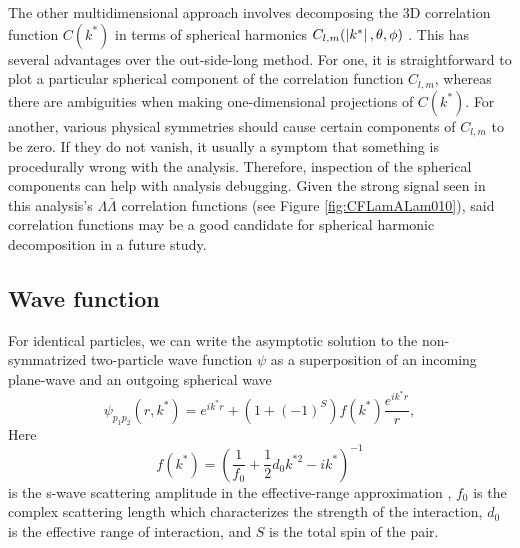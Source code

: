 The other multidimensional approach involves decomposing the 3D correlation function $C(k^*)$ in terms of spherical harmonics $C_{l,m}(\left\lvert k^*\right\rvert,\theta, \phi)$ \cite{Chajecki:2008vg}.
This has several advantages over the out-side-long method.
For one, it is straightforward to plot a particular spherical component of the correlation function $C_{l,m}$, whereas there are ambiguities when making one-dimensional projections of $C(k^*)$.
For another, various physical symmetries should cause certain components of $C_{l,m}$ to be zero.
If they do not vanish, it usually a symptom that something is procedurally wrong with the analysis.
Therefore, inspection of the spherical components can help with analysis debugging.
Given the strong signal seen in this analysis's $\Lambda\bar{\Lambda}$ correlation functions (see Figure \ref{fig:CFLamALam010}), said correlation functions may be a good candidate for spherical harmonic decomposition in a future study.




 
\subsection{Wave function}
\label{sec:WaveFunction}




For identical particles, we can write the asymptotic solution to the non-symmatrized two-particle wave function $\psi$ as a superposition of an incoming plane-wave and an outgoing spherical wave
\begin{equation}
\label{eq:swaveScattering}
\psi_{p_1p_2}(r,k^*) = e^{ik^*r} + (1 + (-1)^S)f(k^*)\frac{e^{ik^*r}}{r},
\end{equation}
Here 
\begin{equation}
\label{eq:ScatteringAmplitude}
f(k^*) = \left(\frac{1}{f_0} + \frac{1}{2}d_0k^{*2}-ik^*\right)^{-1}
\end{equation}
is the s-wave scattering amplitude in the effective-range approximation \cite{LANDAU1977502}, $f_0$ is the complex scattering length which characterizes the strength of the interaction, $d_0$ is the effective range of interaction, and $S$ is the total spin of the pair.

